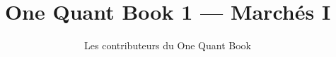 \documentclass[11pt,a4paper,twoside,openany]{book}
\title{One Quant Book 1 --- Marchés I}
\author{Les contributeurs du One Quant Book}
\date{\bookdate}
\begin{document}
\frontmatter



\tableofcontents

\mainmatter


\appendix
\part{\omsolutionspart}


\backmatter
\printindex
\end{document}
